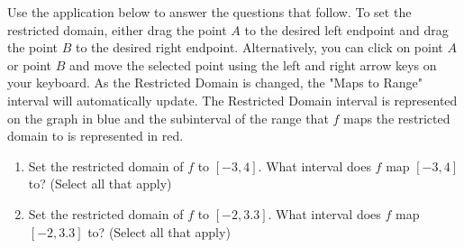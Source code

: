 \documentclass{ximera}
\author{Kevin James}
\begin{document}
   \begin{exercise}
   	  \begin{center}
   	  	Use the application below to answer the questions that follow.  To set the restricted domain, either drag the point $ A $ to the desired left endpoint and drag the point $ B $ to the desired right endpoint.  Alternatively, you can click on point $ A $ or point $ B $ and move the selected point using the left and right arrow keys on your keyboard.  As the Restricted Domain is changed, the "Maps to Range" interval will automatically update.  The Restricted Domain interval is represented on the graph in blue and the subinterval of the range that $ f $ maps the restricted domain to is represented in red.   
   	  	\begin{onlineOnly}
   	    \end{onlineOnly} 
     \end{center}
 	 \begin{enumerate}
 	 	\item Set the restricted domain of $ f $ to $ [-3, 4] $.  What interval does $ f $ map $ [-3, 4] $ to?  (Select all that apply)
   	       \begin{multipleChoice}
   	         \choice{$ \left[f(-3), f(4)\right] $}
   	         \choice{$ [1.576, -1.2] $}
   	         \choice[correct]{$ [-1.428, 2.102] $}
   	       \end{multipleChoice}
        \item Set the restricted domain of $ f $ to $ [-2, 3.3] $.  What interval does $ f $ map $ [-2,3.3] $ to?  (Select all that apply)
           \begin{multipleChoice}
           	\choice[correct]{$ \left[f(-2), f(3.3)\right] $}
           	\choice{$ [-2,2] $}
           	\choice[correct]{$ [-1.428, 2.102] $}
          \end{multipleChoice}
   \end{enumerate}
 \end{exercise}
\end{document}
